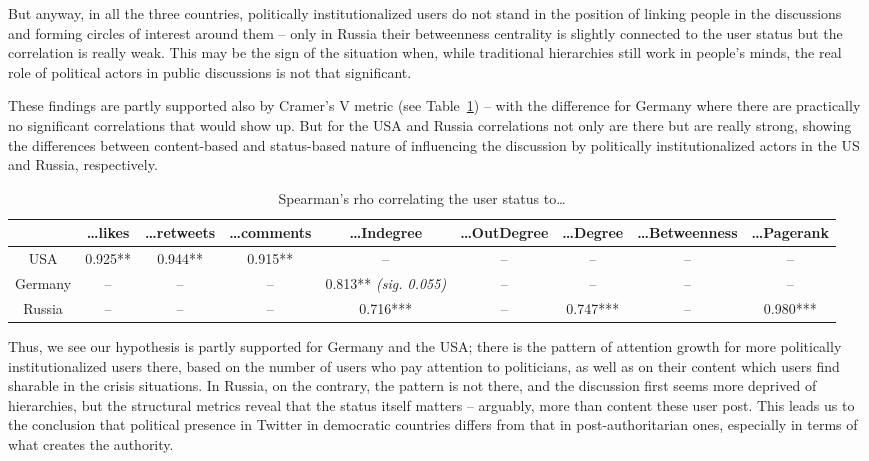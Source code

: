 But anyway, in all the three countries, politically institutionalized users do not stand in the position of linking people in the discussions and forming circles of interest around them – only in Russia their betweenness centrality is slightly connected to the user status but the correlation is really weak. This may be the sign of the situation when, while traditional hierarchies still work in people’s minds, the real role of political actors in public discussions is not that significant.

These findings are partly supported also by Cramer’s V metric (see Table~\cref{tab:userStatusVCorrelation}) -- with the difference for Germany where there are practically no significant correlations that would show up. But for the USA and Russia correlations not only are there but are really strong, showing the differences between content-based and status-based nature of influencing the discussion by politically institutionalized actors in the US and Russia, respectively.

\begin{table}[ht]%
	\centering
	\caption{Spearman’s rho correlating the user status to…}%
	\label{tab:userStatusVCorrelation}%
	\begin{adjustbox}{width=1\textwidth}
		\small
		\begin{tabular}{ c  c  c  c  c  c  c  c  c }%
			\toprule
			& …likes & …retweets & …comments & …Indegree & …OutDegree &…Degree & …Betweenness & …Pagerank \\
			\hline
			USA & 0.925** & 0.944** & 0.915** & -- & -- & -- & -- & -- \\
			Germany & -- & -- & -- & 0.813** \textit{(sig. 0.055)} & -- & -- & -- & -- \\
			Russia & -- & -- & -- & 0.716*** & -- & 0.747*** & -- & 0.980*** \\
			\bottomrule
		\end{tabular}%
	\end{adjustbox}
\end{table}

Thus, we see our hypothesis is partly supported for Germany and the USA; there is the pattern of attention growth for more politically institutionalized users there, based on the number of users who pay attention to politicians, as well as on their content which users find sharable in the crisis situations. In Russia, on the contrary, the pattern is not there, and the discussion first seems more deprived of hierarchies, but the structural metrics reveal that the status itself matters -- arguably, more than content these user post. This leads us to the conclusion that political presence in Twitter in democratic countries differs from that in post-authoritarian ones, especially in terms of what creates the authority.

